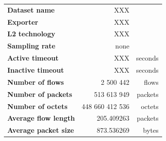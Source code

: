 \begin{tabular}{@{}lrr@{}}
\toprule
\textbf{Dataset name} & XXX & \\
\textbf{Exporter} & XXX & \\
\textbf{L2 technology} & XXX & \\
\textbf{Sampling rate} & none & \\
\textbf{Active timeout} & XXX & seconds \\
\textbf{Inactive timeout} & XXX & seconds \\
\midrule
\textbf{Number of flows} & 2 500 442 & flows \\
\textbf{Number of packets} & 513 613 949 & packets \\
\textbf{Number of octets} & 448 660 412 536 & octets \\
\textbf{Average flow length} & 205.409263 & packets \\
\textbf{Average packet size} & 873.536269 & bytes \\
\bottomrule
\end{tabular}


